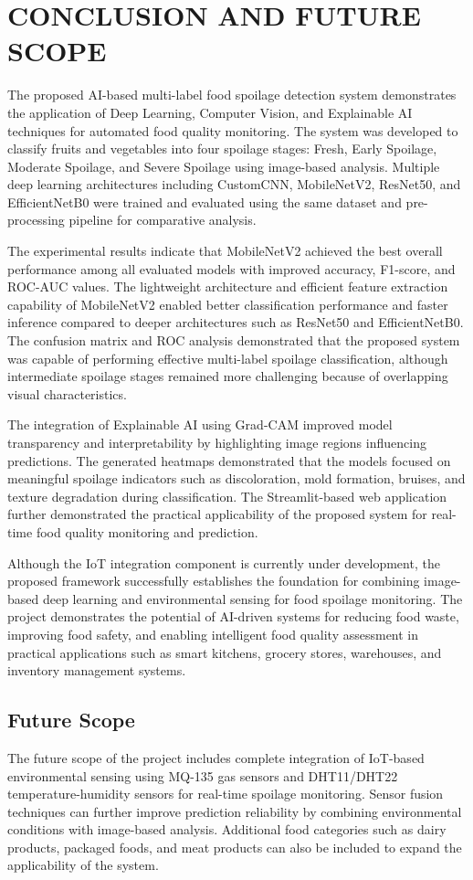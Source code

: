 \chapter{CONCLUSION AND FUTURE SCOPE}
The proposed AI-based multi-label food spoilage detection system demonstrates the application of Deep Learning, Computer Vision, and Explainable AI techniques for automated food quality monitoring. The system was developed to classify fruits and vegetables into four spoilage stages: Fresh, Early Spoilage, Moderate Spoilage, and Severe Spoilage using image-based analysis. Multiple deep learning architectures including CustomCNN, MobileNetV2, ResNet50, and EfficientNetB0 were trained and evaluated using the same dataset and pre-processing pipeline for comparative analysis.

The experimental results indicate that MobileNetV2 achieved the best overall performance among all evaluated models with improved accuracy, F1-score, and ROC-AUC values. The lightweight architecture and efficient feature extraction capability of MobileNetV2 enabled better classification performance and faster inference compared to deeper architectures such as ResNet50 and EfficientNetB0. The confusion matrix and ROC analysis demonstrated that the proposed system was capable of performing effective multi-label spoilage classification, although intermediate spoilage stages remained more challenging because of overlapping visual characteristics.

The integration of Explainable AI using Grad-CAM improved model transparency and interpretability by highlighting image regions influencing predictions. The generated heatmaps demonstrated that the models focused on meaningful spoilage indicators such as discoloration, mold formation, bruises, and texture degradation during classification. The Streamlit-based web application further demonstrated the practical applicability of the proposed system for real-time food quality monitoring and prediction.

Although the IoT integration component is currently under development, the proposed framework successfully establishes the foundation for combining image-based deep learning and environmental sensing for food spoilage monitoring. The project demonstrates the potential of AI-driven systems for reducing food waste, improving food safety, and enabling intelligent food quality assessment in practical applications such as smart kitchens, grocery stores, warehouses, and inventory management systems.

\section[Future Scope]{\textbf{Future Scope}}
The future scope of the project includes complete integration of IoT-based environmental sensing using MQ-135 gas sensors and DHT11/DHT22 temperature-humidity sensors for real-time spoilage monitoring. Sensor fusion techniques can further improve prediction reliability by combining environmental conditions with image-based analysis. Additional food categories such as dairy products, packaged foods, and meat products can also be included to expand the applicability of the system.

